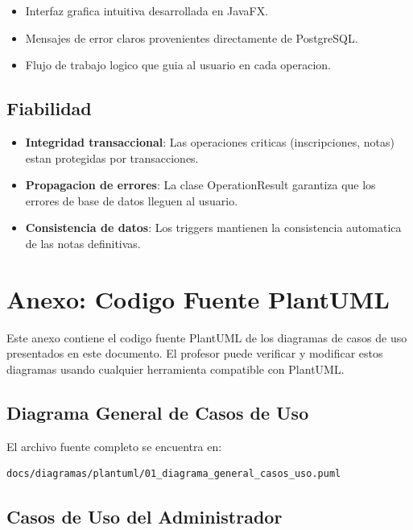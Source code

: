 \documentclass[12pt,a4paper]{article}
\begin{document}
\begin{itemize}
    \item Interfaz grafica intuitiva desarrollada en JavaFX.
    \item Mensajes de error claros provenientes directamente de PostgreSQL.
    \item Flujo de trabajo logico que guia al usuario en cada operacion.
\end{itemize}

\subsection{Fiabilidad}

\begin{itemize}
    \item \textbf{Integridad transaccional}: Las operaciones criticas (inscripciones, notas) estan protegidas por transacciones.
    \item \textbf{Propagacion de errores}: La clase OperationResult garantiza que los errores de base de datos lleguen al usuario.
    \item \textbf{Consistencia de datos}: Los triggers mantienen la consistencia automatica de las notas definitivas.
\end{itemize}

\newpage
\section{Anexo: Codigo Fuente PlantUML}

Este anexo contiene el codigo fuente PlantUML de los diagramas de casos de uso presentados en este documento. El profesor puede verificar y modificar estos diagramas usando cualquier herramienta compatible con PlantUML.

\subsection{Diagrama General de Casos de Uso}

El archivo fuente completo se encuentra en:
\begin{lstlisting}
docs/diagramas/plantuml/01_diagrama_general_casos_uso.puml
\end{lstlisting}

\subsection{Casos de Uso del Administrador}
\end{document}
